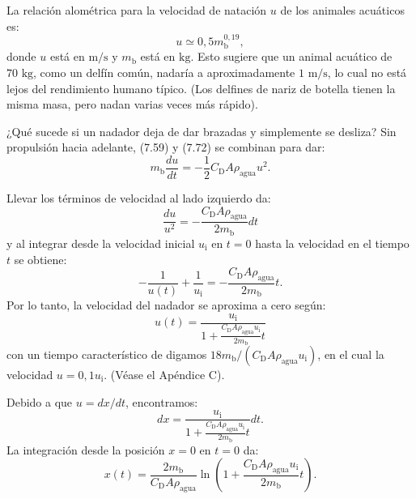 \documentclass[12pt]{book}
\begin{document}
La relación alométrica para la velocidad de natación $u$ de los animales acuáticos es:
\begin{equation}
u \simeq 0{,}5 m_{\text{b}}^{0{,}19},
\label{eq:776}
\end{equation}
donde $u$ está en $\text{m/s}$ y $m_{\text{b}}$ está en $\text{kg}$. Esto sugiere que un animal acuático de $70\text{ kg}$, como un delfín común, nadaría a aproximadamente $1\text{ m/s}$, lo cual no está lejos del rendimiento humano típico. (Los delfines de nariz de botella tienen la misma masa, pero nadan varias veces más rápido).

¿Qué sucede si un nadador deja de dar brazadas y simplemente se desliza? Sin propulsión hacia adelante, (7.59) y (7.72) se combinan para dar:
\begin{equation}
m_{\text{b}} \frac{du}{dt} = -\frac{1}{2} C_{\text{D}} A \rho_{\text{agua}} u^2.
\label{eq:777}
\end{equation}

Llevar los términos de velocidad al lado izquierdo da:
\begin{equation}
\frac{du}{u^2} = -\frac{C_{\text{D}} A \rho_{\text{agua}}}{2 m_{\text{b}}} dt
\label{eq:778}
\end{equation}
y al integrar desde la velocidad inicial $u_{\text{i}}$ en $t = 0$ hasta la velocidad en el tiempo $t$ se obtiene:
\begin{equation}
-\frac{1}{u(t)} + \frac{1}{u_{\text{i}}} = -\frac{C_{\text{D}} A \rho_{\text{agua}}}{2 m_{\text{b}}} t.
\label{eq:779}
\end{equation}
Por lo tanto, la velocidad del nadador se aproxima a cero según:
\begin{equation}
u(t) = \frac{u_{\text{i}}}{1 + \frac{C_{\text{D}} A \rho_{\text{agua}} u_{\text{i}}}{2 m_{\text{b}}} t}
\label{eq:780}
\end{equation}
con un tiempo característico de digamos $18 m_{\text{b}} / (C_{\text{D}} A \rho_{\text{agua}} u_{\text{i}})$, en el cual la velocidad $u = 0{,}1 u_{\text{i}}$. (Véase el Apéndice C).

Debido a que $u = dx/dt$, encontramos:
\begin{equation}
dx = \frac{u_{\text{i}}}{1 + \frac{C_{\text{D}} A \rho_{\text{agua}} u_{\text{i}}}{2 m_{\text{b}}} t} dt.
\label{eq:781}
\end{equation}
La integración desde la posición $x = 0$ en $t = 0$ da:
\begin{equation}
x(t) = \frac{2 m_{\text{b}}}{C_{\text{D}} A \rho_{\text{agua}}} \ln \left( 1 + \frac{C_{\text{D}} A \rho_{\text{agua}} u_{\text{i}}}{2 m_{\text{b}}} t \right).
\label{eq:782}
\end{equation}
\end{document}

